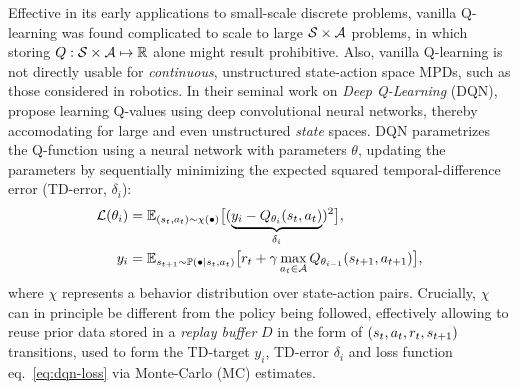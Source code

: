 Effective in its early applications to small-scale discrete problems, vanilla Q-learning was found complicated to scale to large \( \mathcal S \times \mathcal A \) problems, in which storing \( Q : \mathcal S \times \mathcal A \mapsto \mathbb R \) alone might result prohibitive. 
Also, vanilla Q-learning is not directly usable for \emph{continuous}, unstructured state-action space MPDs, such as those considered in robotics.
In their seminal work on \emph{Deep Q-Learning} (DQN),~\citet{mnihPlayingAtariDeep2013} propose learning Q-values using deep convolutional neural networks, thereby accomodating for large and even unstructured \emph{state} spaces.
DQN parametrizes the Q-function using a neural network with parameters \( \theta \), updating the parameters by sequentially minimizing the expected squared temporal-difference error (TD-error, \( \delta_i \)):
\begin{align}
\mathcal L(\theta_i) &= \mathbb E_{(s_t, a_t) \sim \chi(\bullet)} 
    \big[ 
        (\underbrace{y_i - Q_{\theta_i}(s_t, a_t)}_{\delta_i})^2 
    \big], \label{eq:dqn-loss} \\
    y_i &= \mathbb E_{s_{t+1} \sim \mathbb P(\bullet \vert s_t, a_t)} \big[ r_t + \gamma \max_{a_t \in \mathcal A} Q_{\theta_{i-1}} (s_{t+1}, a_{t+1}) \big], \label{eq:TD-target}
\end{align}
where \( \chi \) represents a behavior distribution over state-action pairs. 
Crucially, \( \chi \) can in principle be different from the policy being followed, effectively allowing to reuse prior data stored in a \emph{replay buffer} \( D \) in the form of \( (s_t, a_t, r_t, s_{t+1}) \) transitions, used to form the TD-target \( y_i \), TD-error \( \delta_i \) and loss function eq.~\ref{eq:dqn-loss} via Monte-Carlo (MC) estimates.

